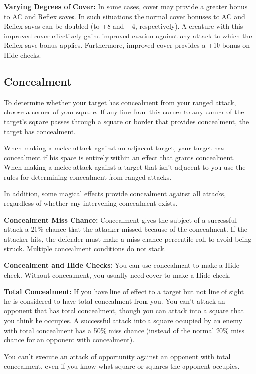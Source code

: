 \textbf{Varying Degrees of Cover:} In some cases, cover may provide a greater bonus 
to AC and Reflex saves. In such situations the normal cover bonuses to AC and Reflex 
saves can be doubled (to +8 and +4, respectively). A creature with this improved 
cover effectively gains improved evasion against any attack to which the Reflex 
save bonus applies. Furthermore, improved cover provides a +10 bonus on Hide checks.

\subsection{Concealment}

To determine whether your target has concealment from your ranged attack, choose 
a corner of your square. If any line from this corner to any corner of the target's 
square passes through a square or border that provides concealment, the target 
has concealment.

When making a melee attack against an adjacent target, your target has concealment 
if his space is entirely within an effect that grants concealment. When making 
a melee attack against a target that isn't adjacent to you use the rules for determining 
concealment from ranged attacks.

In addition, some magical effects provide concealment against all attacks, regardless 
of whether any intervening concealment exists.

\textbf{Concealment Miss Chance:} Concealment gives the subject of a successful 
attack a 20\% chance that the attacker missed because of the concealment. If the 
attacker hits, the defender must make a miss chance percentile roll to avoid being 
struck. Multiple concealment conditions do not stack.

\textbf{Concealment and Hide Checks:} You can use concealment to make a Hide check. 
Without concealment, you usually need cover to make a Hide check.

\textbf{Total Concealment:} If you have line of effect to a target but not line 
of sight he is considered to have total concealment from you. You can't attack 
an opponent that has total concealment, though you can attack into a square that 
you think he occupies. A successful attack into a square occupied by an enemy with 
total concealment has a 50\% miss chance (instead of the normal 20\% miss chance 
for an opponent with concealment).

You can't execute an attack of opportunity against an opponent with total concealment, 
even if you know what square or squares the opponent occupies.


